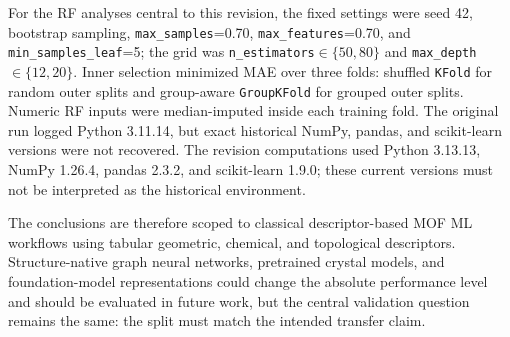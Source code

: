 \documentclass[11pt,a4paper]{article}
\begin{document}
For the RF analyses central to this revision, the fixed settings were seed 42, bootstrap sampling, \texttt{max\_samples}=0.70, \texttt{max\_features}=0.70, and \texttt{min\_samples\_leaf}=5; the grid was \texttt{n\_estimators}$\in\{50,80\}$ and \texttt{max\_depth}$\in\{12,20\}$. Inner selection minimized MAE over three folds: shuffled \texttt{KFold} for random outer splits and group-aware \texttt{GroupKFold} for grouped outer splits. Numeric RF inputs were median-imputed inside each training fold. The original run logged Python 3.11.14, but exact historical NumPy, pandas, and scikit-learn versions were not recovered.  The revision computations used Python 3.13.13, NumPy 1.26.4, pandas 2.3.2, and scikit-learn 1.9.0; these current versions must not be interpreted as the historical environment.


The conclusions are therefore scoped to classical descriptor-based MOF ML workflows using tabular geometric, chemical, and topological descriptors. Structure-native graph neural networks, pretrained crystal models, and foundation-model representations could change the absolute performance level and should be evaluated in future work, but the central validation question remains the same: the split must match the intended transfer claim.
\end{document}
